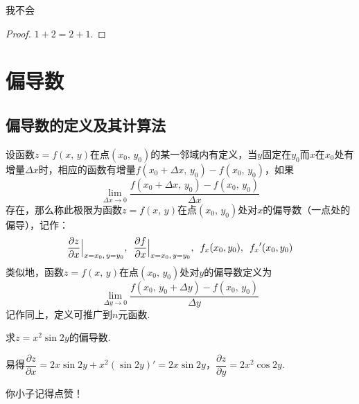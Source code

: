 \documentclass[12pt, a4paper, oneside, UTF8]{ctexbook}
\begin{document}
\begin{rmk}
    我不会
\end{rmk}

\begin{proof}
    $1 + 2 = 2 + 1$.
\end{proof}

\section{偏导数}
\subsection{偏导数的定义及其计算法}
\begin{defn}
    设函数$z=f(x,\,y)$在点$(x_0,\,y_0)$的某一邻域内有定义，当$y$固定在$y_0$而$x$在$x_0$处有增量$\Delta x$时，相应的函数有增量$f(x_0 + \Delta{x},\,y_0) - f(x_0,\,y_0)$，如果
    \[
        \lim_{\Delta{x} \to 0}\frac{f(x_0 + \Delta{x},\,y_0)-f(x_0,\,y_0)}{\Delta{x}}
    \]
    存在，那么称此极限为函数$z=f(x,\,y)$在点$(x_0,\,y_0)$处对$x$的偏导数（一点处的偏导），记作：
    \[
        \frac{\partial z}{\partial x}\Big| _{x=x_0,\, y=y_0} ,\enspace \frac{\partial f}{\partial x}\Big| _{x=x_0,\, y=y_0} ,\enspace f_x(x_0,y_0),\enskip {f_x}'(x_0,y_0)
    \]
    类似地，函数$z=f(x,\,y)$在点$(x_0,\,y_0)$处对$y$的偏导数定义为
    \[
        \lim_{\Delta{y} \to 0}\frac{f(x_0,\,y_0+\Delta{y})-f(x_0,\,y_0)}{\Delta{y}}
    \]
    记作同上，定义可推广到$n$元函数.
\end{defn}

\begin{example}
    求$z = x^2\sin{2y}$的偏导数.
\end{example}
\begin{solution}
    易得$\dfrac{\partial{z}}{\partial{x}} = 2x\sin{2y}+x^2(\sin{2y})' = 2x\sin{2y}$，$\dfrac{\partial{z}}{\partial{y}} = 2x^2\cos{2y}$.
\end{solution}


\begin{center}
    {\LARGE 你小子记得点赞！}
\end{center}

\ifx\allfiles\undefined
\end{document}
